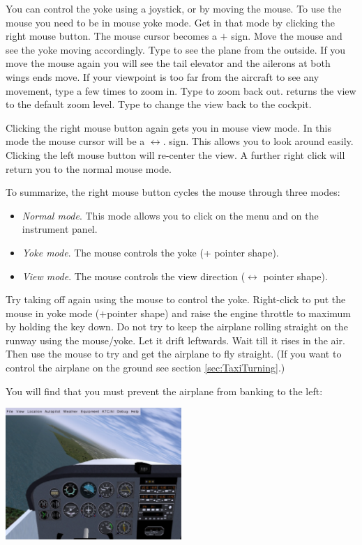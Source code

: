 You can control the yoke using a joystick, or by moving the mouse. To use the
mouse you need to be in mouse yoke mode. Get in that mode by clicking the right
mouse button. The mouse cursor becomes a $+$ sign. Move the mouse and see the 
yoke moving accordingly. Type  to see the plane from the outside. If you
move the mouse again you will see the tail elevator and the ailerons at both 
wings ends move. If your viewpoint is too far from the aircraft to see any
movement, type  a few times to zoom in. 
Type  to zoom back out.  returns the view to the default zoom
level. Type  to change the view back to the cockpit.

Clicking the right mouse button again gets you in mouse view mode.
In this mode the mouse cursor will be a $\leftrightarrow$. sign. This allows you
to look around easily. Clicking the left mouse button will re-center the view. 
A further right click will return you to the normal mouse mode.

To summarize, the right mouse button cycles the mouse through three modes:
\begin{itemize}
	\item \textit{Normal mode}. This mode allows you to 
  click on the menu and on the instrument panel.
	\item \textit{Yoke mode}. 
  The mouse controls the yoke (+ pointer shape). 
	\item \textit{View mode}. The mouse controls the 
  view direction ($\leftrightarrow$ pointer shape).
\end{itemize}

Try taking off again using the mouse to control the yoke. Right-click to put 
the mouse in yoke mode ($+$pointer shape) and raise the engine throttle to 
maximum by holding the  key down. Do not try to keep the airplane 
rolling straight on the runway using the mouse/yoke. Let it drift leftwards.
Wait till it rises in the air. Then use the mouse to try and get the
airplane to fly straight. (If you want to control the airplane on the
ground see section \ref{sec:TaxiTurning}.)

You will find that you must prevent the airplane from banking to the left:

\begin{center}
\includegraphics[width=0.5\textwidth]{img/tut_11}
\end{center}

